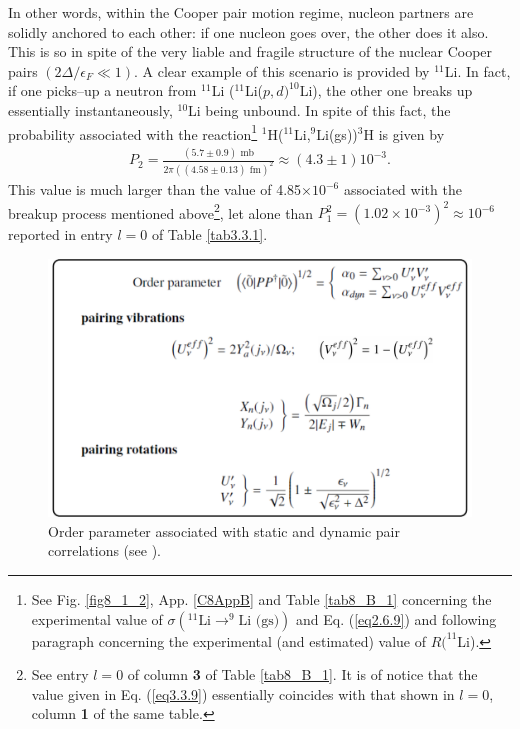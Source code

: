 In other words, within the Cooper pair motion regime, nucleon partners are solidly anchored to each other: if one nucleon goes over, the other does it also. This is so in spite of the very liable and fragile structure of the nuclear Cooper pairs $(2\Delta/\epsilon_F\ll1)$. A clear example of this scenario is  provided by $^{11}$Li. In fact, if one picks--up a neutron from $^{11}$Li ($^{11}$Li($p,d)^{10}$Li), the other one breaks up essentially instantaneously, $^{10}$Li being unbound. In spite of this fact, the probability associated with the reaction\footnote{See  Fig. \ref{fig8_1_2}, App. \ref{C8AppB} and Table \ref{tab8_B_1} concerning the experimental value of $\sigma(^{11}\text{Li}\to ^{9}\text{Li (gs)})$ and Eq. (\ref{eq2.6.9}) and following paragraph concerning the experimental (and estimated) value of $R(^{11}$Li).} $^1$H($^{11}$Li,$^9$Li(gs))$^{3}$H is given by
\begin{align}\label{eq3.3.9}
P_2=\frac{(5.7\pm0.9)\text{ mb}}{2\pi((4.58\pm0.13)\text{ fm})^2}\approx(4.3\pm1)10^{-3}.
\end{align}
This value is much larger than the value of 4.85$\times10^{-6}$ associated with the breakup process mentioned above\footnote{See entry $l=0$ of column \textbf{3} of Table \ref{tab8_B_1}. It is of notice that the value given in Eq. (\ref{eq3.3.9}) essentially coincides with that shown in $l=0$, column \textbf{1} of the same table.}, let alone than $P_1^2=(1.02\times10^{-3})^2\approx 10^{-6}$ reported in entry $l=0$ of Table \ref{tab3.3.1}.
\begin{figure}
\centerline{\includegraphics*[width=15cm,angle=0]{nutshell/figs/fig3_3_2.pdf}}
\caption{Order parameter associated with static and dynamic pair correlations (see \cite{Potel:13b}).}\label{fig3.3.2}
\end{figure}

